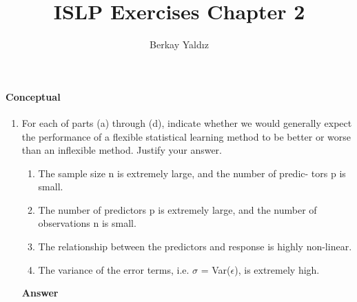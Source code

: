 \documentclass[12pt, letterpaper]{article}
\author{Berkay Yaldız}
\title{ISLP Exercises Chapter 2}
\begin{document}
\maketitle
	\paragraph{Conceptual\newline}
	\begin{enumerate}
		\item For each of parts (a) through (d), indicate whether we would generally
		expect the performance of a flexible statistical learning method to be
		better or worse than an inflexible method. Justify your answer.
		\begin{enumerate}
			\item The sample size n is extremely large, and the number of predic-
			tors p is small.
			\item The number of predictors p is extremely large, and the number
			of observations n is small.
			\item The relationship between the predictors and response is highly
			non-linear.
			\item The variance of the error terms, i.e. $\sigma$ = Var($\epsilon$), is extremely
			high.
		\end{enumerate}

		\textbf{Answer}


	
	\end{enumerate}
\end{document}
